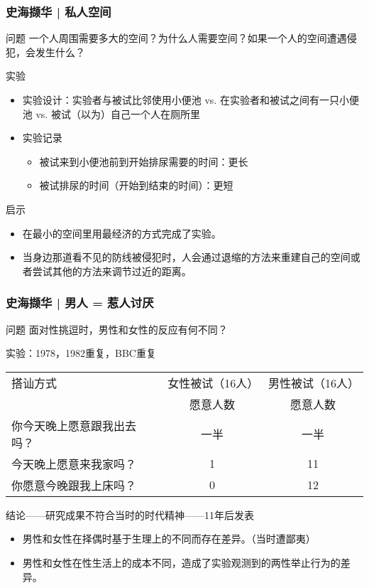 \begin{frame}
  \frametitle{史海撷华 | 私人空间}
  \begin{block}{问题}
      一个人周围需要多大的空间？为什么人需要空间？如果一个人的空间遭遇侵犯，会发生什么？
  \end{block}
  \vspace{-0.3em}
  \pause
  \begin{block}{实验}
    \begin{itemize}
      \item 实验设计：实验者与被试比邻使用小便池 vs. 在实验者和被试之间有一只小便池 vs. 被试（以为）自己一个人在厕所里
      \item 实验记录
        \begin{itemize}
          \item 被试来到小便池前到开始排尿需要的时间：更长
          \item 被试排尿的时间（开始到结束的时间）：更短
        \end{itemize}
    \end{itemize}
  \end{block}
  \vspace{-0.3em}
  \pause
  \begin{block}{启示}
    \begin{itemize}
      \item 在最小的空间里用最经济的方式完成了实验。
      \item 
 当身边那道看不见的防线被侵犯时，人会通过退缩的方法来重建自己的空间或者尝试其他的方法来调节过近的距离。
    \end{itemize}
  \end{block}
\end{frame}

\begin{frame}
  \frametitle{史海撷华 | 男人 = 惹人讨厌}
  \begin{block}{问题}
    面对性挑逗时，男性和女性的反应有何不同？
  \end{block}
  \pause
  \begin{block}{实验：1978，1982重复，BBC重复}
  \begin{tabular}{lcc}
    \hline
    搭讪方式 & 女性被试（16人） & 男性被试（16人）\\
    & 愿意人数 & 愿意人数\\
    \hline
    你今天晚上愿意跟我出去吗？ & 一半 & 一半\\
    今天晚上愿意来我家吗？ & 1 & 11\\
    你愿意今晚跟我上床吗？ & 0 & 12\\
    \hline
  \end{tabular}
  \end{block}
  \pause
  \begin{block}{结论——研究成果不符合当时的时代精神——11年后发表}
    \begin{itemize}
      \item 男性和女性在择偶时基于生理上的不同而存在差异。（当时遭鄙夷）
      \item 男性和女性在性生活上的成本不同，造成了实验观测到的两性举止行为的差异。
    \end{itemize}
  \end{block}
\end{frame}


